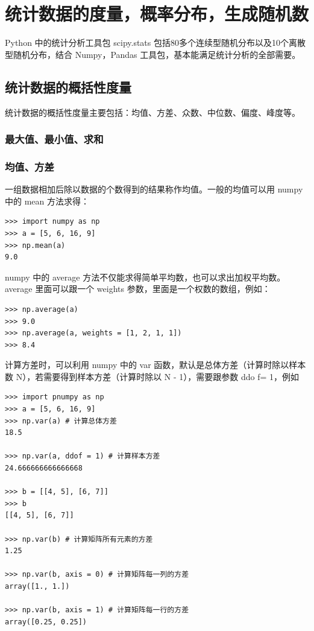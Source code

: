 \chapter{统计数据的度量，概率分布，生成随机数}

Python 中的统计分析工具包 scipy.stats 包括80多个连续型随机分布以及10个离散型随机分布，结合 Numpy，Pandas 工具包，基本能满足统计分析的全部需要。

\section{统计数据的概括性度量}

统计数据的概括性度量主要包括：均值、方差、众数、中位数、偏度、峰度等。

\subsection{最大值、最小值、求和}

\subsection{均值、方差}

一组数据相加后除以数据的个数得到的结果称作均值。一般的均值可以用 numpy 中的 mean 方法求得：

\begin{lstlisting}[Language=Python]
>>> import numpy as np
>>> a = [5, 6, 16, 9]
>>> np.mean(a)
9.0
\end{lstlisting}

numpy 中的 average 方法不仅能求得简单平均数，也可以求出加权平均数。average 里面可以跟一个 weights 参数，里面是一个权数的数组，例如：

\begin{lstlisting}[Language=Python]
>>> np.average(a)
>>> 9.0
>>> np.average(a, weights = [1, 2, 1, 1])
>>> 8.4
\end{lstlisting}


计算方差时，可以利用 numpy 中的 var 函数，默认是总体方差（计算时除以样本数 N），若需要得到样本方差（计算时除以 N - 1），需要跟参数 ddo f= 1，例如

\begin{lstlisting}[Language=Python]
>>> import pnumpy as np
>>> a = [5, 6, 16, 9]
>>> np.var(a) # 计算总体方差
18.5

>>> np.var(a, ddof = 1) # 计算样本方差
24.666666666666668

>>> b = [[4, 5], [6, 7]]
>>> b
[[4, 5], [6, 7]]

>>> np.var(b) # 计算矩阵所有元素的方差
1.25

>>> np.var(b, axis = 0) # 计算矩阵每一列的方差
array([1., 1.])

>>> np.var(b, axis = 1) # 计算矩阵每一行的方差
array([0.25, 0.25])

\end{lstlisting}

